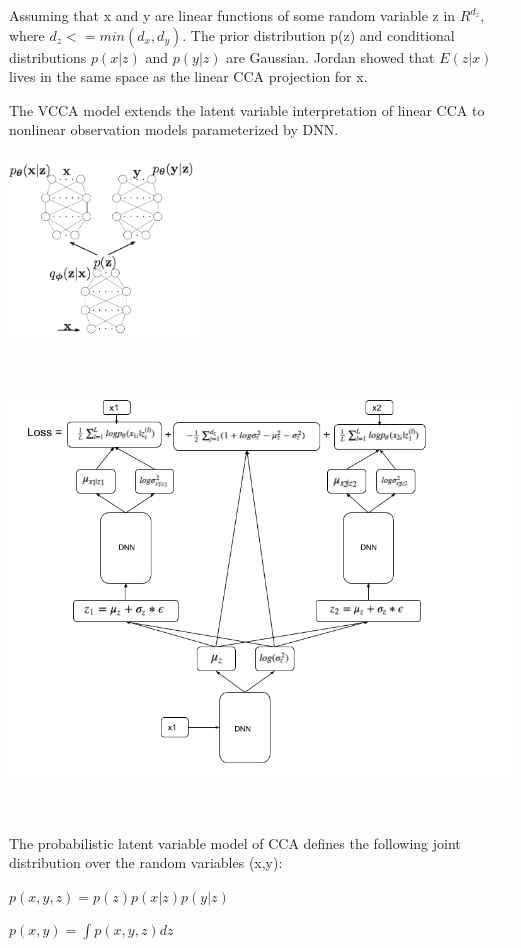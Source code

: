 \documentclass[a4paper]{article}
\begin{document}
Assuming that x and y are linear functions of some random variable z in $R^{d_z}$, where $d_z <= min(d_x,d_y)$. The prior distribution p(z) and conditional distributions $p(x|z)$ and $p(y|z)$ are Gaussian. Jordan showed that $E(z|x)$ lives in the same space as the linear CCA projection for x.

The VCCA model extends the latent variable interpretation of linear CCA to nonlinear observation models parameterized by DNN.
\begin{center}
\includegraphics[width=5cm, height=5cm]{vcca.png}

\includegraphics[width=15cm, height=12cm]{vcca_nn.png}
\end{center}
The probabilistic latent variable model of CCA defines the following joint distribution over the random variables (x,y):
    
$p(x,y,z) = p(z)p(x|z)p(y|z)$

$p(x,y)=\int p(x,y,z)dz$
\end{document}
